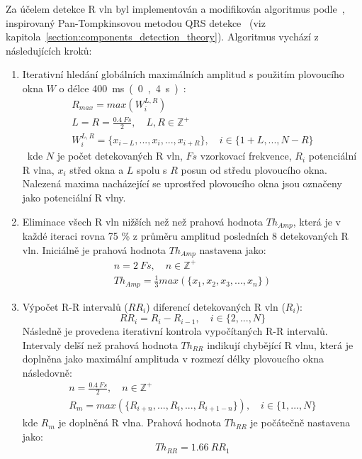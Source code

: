 Za účelem detekce R vln byl implementován a modifikován algoritmus
podle~\cite{Nabian2018}, inspirovaný Pan-Tompkinsovou metodou QRS
detekce~\cite{Pan1985} (viz kapitola~\ref{section:components_detection_theory}).
Algoritmus vychází z následujících kroků:
\begin{enumerate}
    \item Iterativní hledání globálních maximálních amplitud s použitím
          plovoucího okna $W$ o délce 400~\si\ms~(0,4~\si\s):
          \begin{gather}
              R_{max} = max(W_i^{L,R}) \nonumber \\
              L = R = \frac{0.4~Fs}{2}, \quad L,R \in \mathbb{Z^+} \nonumber \\
              W_i^{L,R} = \{x_{i-L},...,x_i,...,x_{i+R}\}, \quad i \in \{1+L,...,N-R\}
          \end{gather}
          kde $N$ je počet detekovaných R vln, $Fs$ vzorkovací frekvence, $R_i$
          potenciální R vlna, $x_i$ střed okna a $L$ spolu s $R$ posun od středu
          plovoucího okna. Nalezená maxima nacházející se uprostřed plovoucího
          okna jsou označeny jako potenciální R vlny.
    \item Eliminace všech R vln nižších než než prahová hodnota $Th_{Amp}$, která je v
          každé iteraci rovna 75 \% z průměru amplitud posledních 8 detekovaných
          R vln. Iniciálně je prahová hodnota $Th_{Amp}$ nastavena jako:
          \begin{gather}
              n = 2~Fs, \quad n \in \mathbb{Z^+} \nonumber \\
              Th_{Amp} = \frac{1}{3} max(\{x_1,x_2,x_3,...,x_n\})
          \end{gather}
    \item Výpočet R-R intervalů ($RR_i$) diferencí detekovaných R vln ($R_i$):
          \begin{equation}
              RR_i = R_{i} - R_{i-1}, \quad i \in \{2,...,N\}
          \end{equation}
          Následně je provedena iterativní kontrola vypočítaných R-R intervalů.
          Intervaly delší než prahová hodnota $Th_{RR}$ indikují chybějící R
          vlnu, která je doplněna jako maximální amplituda v rozmezí délky
          plovoucího okna následovně:
          \begin{gather}
              n = \frac{0.4~Fs}{2}, \quad n \in \mathbb{Z^+} \nonumber \\
              R_m = max(\{R_{i+n},...,R_i,...,R_{i+1-n}\}), \quad i \in \{1,...,N\}
          \end{gather}
          kde $R_m$ je doplněná R vlna. Prahová hodnota $Th_{RR}$ je počátečně
          nastavena jako:
          \begin{equation}
              Th_{RR} = 1.66~RR_1
          \end{equation}
\end{enumerate}

